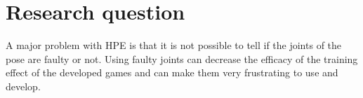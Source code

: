 \section{Research question}

A major problem with HPE is that it is not possible to tell if the joints of the pose are faulty or not. Using faulty joints can decrease the efficacy of the training effect of the developed games and can make them very frustrating to use and develop. 

